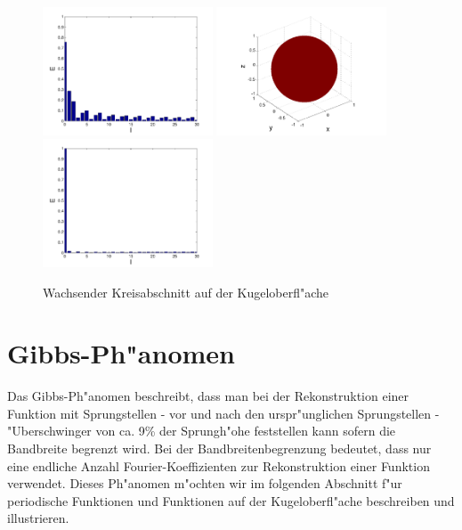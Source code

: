 \begin{refsection}
\begin{figure}
\includegraphics[width=0.45\textwidth]{kugel/Dkonstant/Kugel3_2.pdf}
\includegraphics[width=0.45\textwidth]{kugel/Dkonstant/Kugel4_1.pdf}
\includegraphics[width=0.45\textwidth]{kugel/Dkonstant/Kugel4_2.pdf}
\caption{Wachsender Kreisabschnitt auf der Kugeloberfl"ache
\label{skript:Dirac2}}
\end{figure}

\section{Gibbs-Ph"anomen}
Das Gibbs-Ph"anomen beschreibt, dass man bei der Rekonstruktion einer
Funktion mit Sprungstellen - vor und nach den urspr"unglichen 
Sprungstellen - "Uberschwinger von ca. 9\% der Sprungh"ohe feststellen 
kann sofern die Bandbreite begrenzt wird. 
Bei der Bandbreitenbegrenzung bedeutet, dass nur eine endliche Anzahl 
Fourier-Koeffizienten zur Rekonstruktion einer Funktion verwendet. 
Dieses Ph"anomen m"ochten wir im folgenden Abschnitt f"ur periodische 
Funktionen und Funktionen auf der Kugeloberfl"ache beschreiben und 
illustrieren.


\end{refsection}
